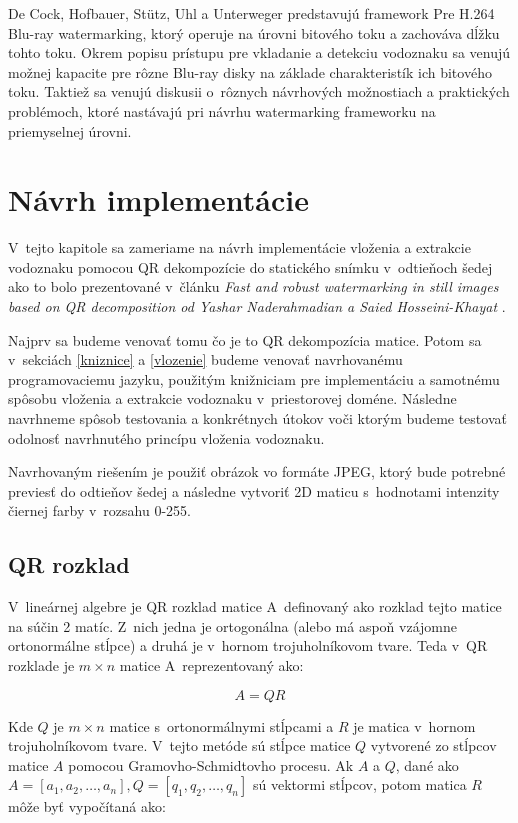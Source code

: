 De Cock, Hofbauer, Stütz, Uhl a Unterweger \cite{DeCock2015} predstavujú framework Pre H.264 Blu-ray watermarking, ktorý operuje na úrovni bitového toku a zachováva dĺžku tohto toku. Okrem popisu prístupu pre vkladanie a detekciu vodoznaku sa venujú možnej kapacite pre rôzne Blu-ray disky na základe charakteristík ich bitového toku. Taktiež sa venujú diskusii o~rôznych návrhových možnostiach a praktických problémoch, ktoré nastávajú pri návrhu watermarking frameworku na priemyselnej úrovni.

\chapter{Návrh implementácie}
V~tejto kapitole sa zameriame na návrh implementácie vloženia a extrakcie vodoznaku pomocou QR dekompozície do statického snímku v~odtieňoch šedej ako to bolo prezentované v~článku {\it Fast and robust watermarking in still images based on QR decomposition od Yashar Naderahmadian a Saied Hosseini-Khayat} \cite{QRdecomposition}.

Najprv sa budeme venovať tomu čo je to QR dekompozícia matice. Potom sa v~sekciách \ref{kniznice} a \ref{vlozenie} budeme venovať navrhovanému programovaciemu jazyku, použitým knižniciam pre implementáciu a samotnému spôsobu vloženia a extrakcie vodoznaku v~priestorovej doméne. Následne navrhneme spôsob testovania a konkrétnych útokov voči ktorým budeme testovať odolnosť navrhnutého princípu vloženia vodoznaku.

Navrhovaným riešením je použiť obrázok vo formáte JPEG, ktorý bude potrebné previesť do odtieňov šedej a následne vytvoriť 2D maticu s~hodnotami intenzity čiernej farby v~rozsahu 0-255.

\section{QR rozklad}
V~lineárnej algebre je QR rozklad matice A~definovaný ako rozklad tejto matice na súčin 2 matíc. Z~nich jedna je ortogonálna (alebo má aspoň vzájomne ortonormálne stĺpce) a druhá je v~hornom trojuholníkovom tvare. Teda v~QR rozklade je $m \times n$ matice A~reprezentovaný ako:

\begin{equation}
A = QR
\end{equation}

Kde $Q$ je $m \times n$ matice s~ortonormálnymi stĺpcami a $R$ je matica v~hornom trojuholníkovom tvare. V~tejto metóde sú stĺpce matice $Q$ vytvorené zo stĺpcov matice $A$ pomocou Gramovho-Schmidtovho procesu. Ak $A$ a $Q$, dané ako $A=[a_1, a_2, \dots, a_n ], Q=[q_1, q_2, \dots, q_n ] $ sú vektormi stĺpcov, potom matica $R$ môže byť vypočítaná ako:

